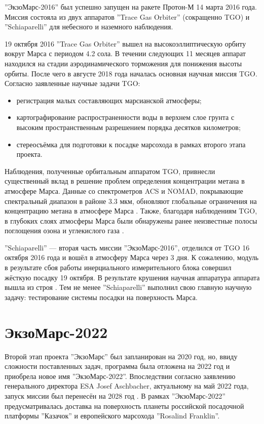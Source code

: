 \documentclass{mipt-thesis-bs}
\begin{document}
	''ЭкзоМарс-2016'' был успешно запущен на ракете Протон-М 14 марта 2016 года. Миссия состояла из двух аппаратов ''Trace Gas Orbiter'' (сокращенно TGO) и ''Schiaparelli'' для небесного и наземного наблюдения. 
	
	19 октября 2016 ''Trace Gas Orbiter'' вышел на высокоэллиптическую орбиту вокруг Марса с периодом 4.2 сола. В течении следующих 11 месяцев аппарат находился на стадии аэродинамического торможения для понижения высоты орбиты. После чего в августе 2018 года началась основная научная миссия TGO. Согласно \cite{IKI} заявленные научные задачи TGO:
	
	\begin{itemize}
		\item регистрация малых составляющих марсианской атмосферы;
		\item картографирование распространенности воды в верхнем слое грунта с высоким пространственным разрешением порядка десятков километров;
		\item стереосъёмка для подготовки к посадке марсохода в рамках второго этапа проекта.
	\end{itemize}
	
	Наблюдения, полученные орбитальным аппаратом TGO, привнесли существенный вклад в решение проблем определения концентрации метана в атмосфере Марса. Данные со спектрометров ACS и NOMAD, покрывающие спектральный диапазон в районе 3.3 мкм, обновляют глобальные ограничения на концентрацию метана в атмосфере Марса \cite{olsen2020first}. Также, благодаря наблюдениям TGO, в глубоких слоях атмосферы Марса были обнаружены ранее неизвестные полосы поглощения озона и углекислого газа \cite{trokhimovskiy2020first}. 
	 
	 ''Schiaparelli'' --- вторая часть миссии ''ЭкзоМарс-2016'',  отделился от TGO 16 октября 2016 года и вошёл в атмосферу Марса через 3 дня. К сожалению, модуль в результате сбоя работы инерциального измерительного блока совершил жёсткую посадку 19 октября. В результате крушения научная аппаратура аппарата вышла из строя \cite{Interfax}. Тем не менее ''Schiaparelli'' выполнил свою главную научную задачу: тестирование системы посадки на поверхность Марса. 
	 
	 \section{ЭкзоМарс-2022}
	 	Второй этап проекта ''ЭкзоМарс'' был запланирован на 2020 год, но, ввиду сложности поставленных задач, программа была отложена на 2022 год и приобрела новое имя ''ЭкзоМарс-2022''. Впоследствии согласно заявлению генерального директора ESA Josef Aschbacher, актуальному на май 2022 года, запуск миссии был перенесён на 2028 год \cite{Spacenews}. В рамках ''ЭкзоМарс-2022'' предусматривалась доставка на поверхность планеты российской посадочной платформы ''Казачок'' и европейского марсохода ''Rosalind Franklin''. 
	 	
\end{document}
